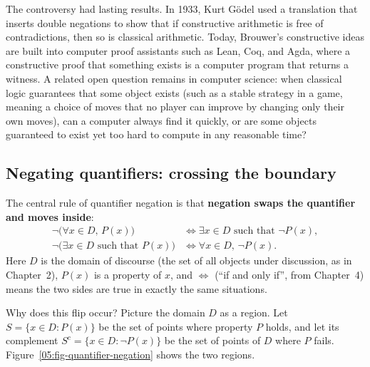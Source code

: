 \begin{historybox}
The controversy had lasting results. In 1933, Kurt Gödel used a translation that inserts double negations to show that if constructive arithmetic is free of contradictions, then so is classical arithmetic. Today, Brouwer's constructive ideas are built into computer proof assistants such as Lean, Coq, and Agda, where a constructive proof that something exists is a computer program that returns a witness. A related open question remains in computer science: when classical logic guarantees that some object exists (such as a stable strategy in a game, meaning a choice of moves that no player can improve by changing only their own moves), can a computer always find it quickly, or are some objects guaranteed to exist yet too hard to compute in any reasonable time?
\end{historybox}

\subsection{Negating quantifiers: crossing the boundary}

The central rule of quantifier negation is that \textbf{negation swaps the quantifier and moves inside}:
\begin{align*}
\neg \bigl(\forall x \in D, \, P(x)\bigr) &\iff \exists x \in D \text{ such that } \neg P(x), \\
\neg \bigl(\exists x \in D \text{ such that } P(x)\bigr) &\iff \forall x \in D, \, \neg P(x).
\end{align*}
Here $D$ is the domain of discourse (the set of all objects under discussion, as in Chapter~2), $P(x)$ is a property of $x$, and $\iff$ (``if and only if'', from Chapter~4) means the two sides are true in exactly the same situations.

Why does this flip occur? Picture the domain $D$ as a region. Let $S = \{x \in D : P(x)\}$ be the set of points where property $P$ holds, and let its complement $S^c = \{x \in D : \neg P(x)\}$ be the set of points of $D$ where $P$ fails. Figure~\ref{05:fig-quantifier-negation} shows the two regions.

